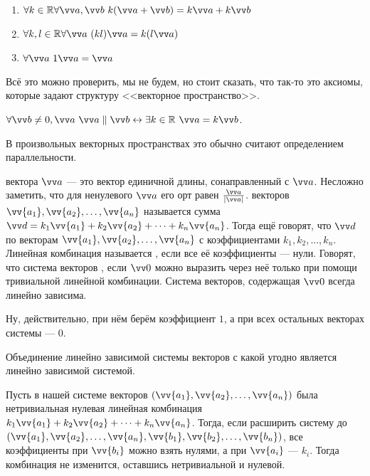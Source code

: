 \documentclass{article}
\let\vec\vv
\begin{document}
\begin{itemize}
\begin{Comment}
\begin{enumerate}[1.]
                \item $\forall k\in\mathbb R\forall\vec a,\vec b~k(\vec a+\vec b)=k\vec a+k\vec b$
                \item $\forall k,l\in\mathbb R\forall\vec a~(kl)\vec a=k(l\vec a)$
                \item $\forall\vec a~1\vec a=\vec a$
            \end{enumerate}
            Всё это можно проверить, мы не будем, но стоит сказать, что так-то это аксиомы, которые задают структуру <<векторное пространство>>.\\
        \end{Comment}
        \thm $\forall\vec b\neq 0,\vec a~\vec a\parallel\vec b\leftrightarrow\exists k\in\mathbb R~\vec a=k\vec b$.
        \begin{Comment}
            В произвольных векторных пространствах это обычно считают определением параллельности.
        \end{Comment}
        \dfn {} вектора $\vec a$ --- это вектор единичной длины, сонаправленный с $\vec a$.
        \thm Несложно заметить, что для ненулевого $\vec a$ его орт равен $\frac{\vec a}{|\vec a|}$.
        \dfn {} векторов $\vec{a_1},\vec{a_2},\ldots,\vec{a_n}$ называется сумма $\vec d=k_1\vec{a_1}+k_2\vec{a_2}+\cdots+k_n\vec{a_n}$.
        Тогда ещё говорят, что $\vec d$  по векторам $\vec{a_1},\vec{a_2},\ldots,\vec{a_n}$ с коэффициентами $k_1,k_2,\ldots,k_n$.
        \dfn Линейная комбинация называется , если все её коэффициенты --- нули.
        \dfn Говорят, что система векторов , если $\vec0$ можно выразить через неё только при помощи тривиальной линейной комбинации.
        \thm Система векторов, содержащая $\vec0$ всегда линейно зависима.
        \begin{Proof}
            Ну, действительно, при нём берём коэффициент $1$, а при всех остальных векторах системы --- $0$.
        \end{Proof}
        \thm Объединение линейно зависимой системы векторов с какой угодно является линейно зависимой системой.
        \begin{Proof}
            Пусть в нашей системе векторов $(\vec{a_1},\vec{a_2},\ldots,\vec{a_n})$ была нетривиальная нулевая линейная комбинация $k_1\vec{a_1}+k_2\vec{a_2}+\cdots+k_n\vec{a_n}$. Тогда, если расширить систему до $(\vec{a_1},\vec{a_2},\ldots,\vec{a_n},\vec{b_1},\vec{b_2},\ldots,\vec{b_n})$, все коэффициенты при $\vec{b_i}$ можно взять нулями, а при $\vec{a_i}$ --- $k_i$. Тогда комбинация не изменится, оставшись нетривиальной и нулевой.

\end{Proof}
\end{itemize}
\end{document}
